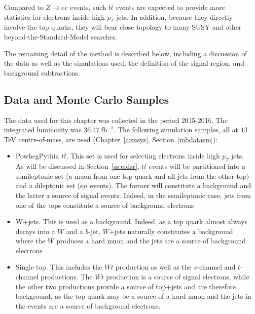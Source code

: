 Compared to $Z\to ee$ events, such $t\bar{t}$ events are expected to provide
more statistics for electrons inside high $p_T$ jets. In addition, because
they directly involve the top quarks, they will bear close topology to many
SUSY and other beyond-the-Standard-Model searches.

The remaining detail of the method is described below, including a discussion
of the data as well as the simulations used, the definition of the signal
region, and background subtractions.


\subsection{Data and Monte Carlo Samples}\label{ss:eidsp}

The data used for this chapter was collected in the period 2015-2016. The
integrated luminosity was $36.47~\text{fb}^{-1}$. The following simulation
samples, all at $13$ TeV centre-of-mass, are used (Chapter~\ref{c:susys},
Section~\ref{mbdatasm}):

\begin{itemize}[label=]

	\item PowhegPythia $t\bar{t}$. This set is used for selecting electrons inside
	      high $p_T$ jets. As will be discussed in Section~\ref{ss:eidsr}, $t\bar{t}$
	      events will be partitioned into a semileptonic set (a muon from one top quark
	      and all jets from the other top) and a dileptonic set ($e\mu$ events). The
	      former will constitute a background and the latter a source of signal events.
	      Indeed, in the semileptonic case, jets from one of the tops constitute a source
	      of background electrons

	\item W+jets. This is used as a background. Indeed, as a top quark almost
	      always decays into a $W$ and a $b$-jet, $W$+jets naturally constitutes a
	      background where the $W$ produces a hard muon and the jets are a source of
	      background electrons

	\item Single top. This includes the $Wt$ production as well as the $s$-channel
	      and $t$-channel productions. The $Wt$ production is a source of signal
	      electrons, while the other two productions provide a source of top+jets and are
	      therefore background, as the top quark may be a source of a hard muon and the
	      jets in the events are a source of background electrons.

\end{itemize}
